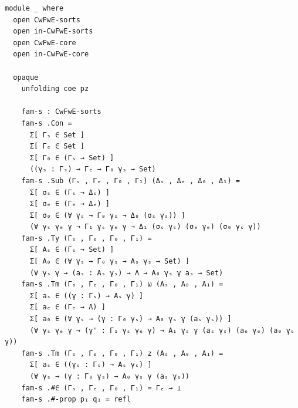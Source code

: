 {\begin{Verbatim}[breaklines=true,breakanywhere=true,fontsize=\scriptsize]
module _ where
  open CwFwE-sorts
  open in-CwFwE-sorts
  open CwFwE-core
  open in-CwFwE-core

  opaque
    unfolding coe pz

    fam-s : CwFwE-sorts
    fam-s .Con =
      Σ[ Γₛ ∈ Set ]
      Σ[ Γₑ ∈ Set ]
      Σ[ Γ₀ ∈ (Γₛ → Set) ]
      ((γₛ : Γₛ) → Γₑ → Γ₀ γₛ → Set)
    fam-s .Sub (Γₛ , Γₑ , Γ₀ , Γ₁) (Δₛ , Δₑ , Δ₀ , Δ₁) =
      Σ[ σₛ ∈ (Γₛ → Δₛ) ]
      Σ[ σₑ ∈ (Γₑ → Δₑ) ]
      Σ[ σ₀ ∈ (∀ γₛ → Γ₀ γₛ → Δ₀ (σₛ γₛ)) ]
      (∀ γₛ γₑ γ → Γ₁ γₛ γₑ γ → Δ₁ (σₛ γₛ) (σₑ γₑ) (σ₀ γₛ γ))  
    fam-s .Ty (Γₛ , Γₑ , Γ₀ , Γ₁) =
      Σ[ Aₛ ∈ (Γₛ → Set) ]
      Σ[ A₀ ∈ (∀ γₛ → Γ₀ γₛ → Aₛ γₛ → Set) ]
      (∀ γₛ γ → (aₛ : Aₛ γₛ) → Λ → A₀ γₛ γ aₛ → Set)
    fam-s .Tm (Γₛ , Γₑ , Γ₀ , Γ₁) ω (Aₛ , A₀ , A₁) =
      Σ[ aₛ ∈ ((γ : Γₛ) → Aₛ γ) ]
      Σ[ aₑ ∈ (Γₑ → Λ) ] 
      Σ[ a₀ ∈ (∀ γₛ → (γ : Γ₀ γₛ) → A₀ γₛ γ (aₛ γₛ)) ]
      (∀ γₛ γₑ γ → (γ' : Γ₁ γₛ γₑ γ) → A₁ γₛ γ (aₛ γₛ) (aₑ γₑ) (a₀ γₛ γ)) 
    fam-s .Tm (Γₛ , Γₑ , Γ₀ , Γ₁) z (Aₛ , A₀ , A₁) =
      Σ[ aₛ ∈ ((γₛ : Γₛ) → Aₛ γₛ) ]
      (∀ γₛ → (γ : Γ₀ γₛ) → A₀ γₛ γ (aₛ γₛ))
    fam-s .#∈ (Γₛ , Γₑ , Γ₀ , Γ₁) = Γₑ → ⊥
    fam-s .#-prop p₁ q₁ = refl


\end{Verbatim}}
